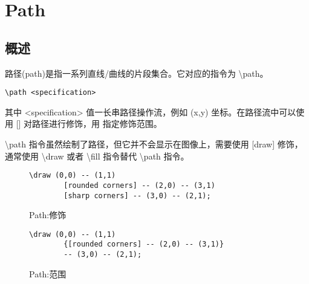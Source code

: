\newpage
\section{Path}
\subsection{概述}

路径(path)是指一系列直线/曲线的片段集合。它对应的指令为 \textbackslash path。

\begin{lstlisting}[style = latex]
    \path <specification>
\end{lstlisting}

其中 <specification> 值一长串路径操作流，例如 (x,y) 坐标。在路径流中可以使用 [] 对路径进行修饰，用 {} 指定修饰范围。

\textbackslash path 指令虽然绘制了路径，但它并不会显示在图像上，需要使用 [draw] 修饰，通常使用 \textbackslash draw 或者 \textbackslash fill 指令替代 \textbackslash path 指令。

\begin{figure}[H]
    \centering
    \begin{minipage}{0.35\linewidth}
        \centering
    \end{minipage}
    \begin{minipage}{0.55\linewidth}
        \begin{lstlisting}[style = latex-side]
    \draw (0,0) -- (1,1)
        [rounded corners] -- (2,0) -- (3,1)
        [sharp corners] -- (3,0) -- (2,1);
        \end{lstlisting}
    \end{minipage}
    \caption{Path:修饰}
\end{figure}

\begin{figure}[H]
    \centering
    \begin{minipage}{0.35\linewidth}
        \centering
    \end{minipage}
    \begin{minipage}{0.55\linewidth}
        \begin{lstlisting}[style = latex-side]
    \draw (0,0) -- (1,1) 
        {[rounded corners] -- (2,0) -- (3,1)}
        -- (3,0) -- (2,1);
        \end{lstlisting}
    \end{minipage}
    \caption{Path:范围}
\end{figure}

